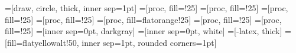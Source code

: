 

=[draw, circle, thick, inner sep=1pt]
=[proc, fill=\leadercolor!25]
=[proc, fill=\proposercolor!25]
=[proc, fill=\depservicecolor!25]
=[proc, fill=\consensuscolor!25]
=[proc, fill=flatorange!25]
=[proc, fill=\replicacolor!25]
=[proc, fill=\clientcolor!25]
=[inner sep=0pt, darkgray]
=[inner sep=0pt, white]
=[-latex, thick]
=[fill=flatyellowalt!50, inner sep=1pt, rounded corners=1pt]

\newcommand{\threekwidth}{0.6}
\newcommand{\kwidth}{0.2}
\newcommand{\kthirdwidth}{0.066666}
\newcommand{\thetop}[2]{($#1 + 0.5*(0,#2)$)}
\newcommand{\themidi}[2]{($#1 + 0.5*0.33*(0,#2)$)}
\newcommand{\themidii}[2]{($#1 - 0.5*0.33*(0,#2)$)}
\newcommand{\thebot}[2]{($#1 - 0.5*(0,#2)$)}
\newcommand{\threekcolor}{black}
\newcommand{\kcolor}{black!66}
\newcommand{\thirdkcolor}{black!33}

